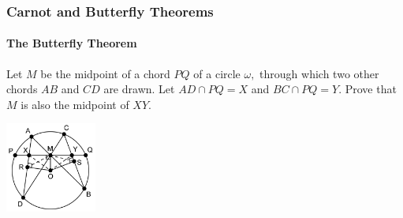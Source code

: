 \documentclass[8pt,xcolor=table,dvipsnames]{beamer}
\begin{document}
\begin{frame}[t]
    \frametitle{Carnot and Butterfly Theorems}
    \framesubtitle{The Butterfly Theorem}
    \begin{theorem}
        \label{problem:24-25-S2-G3-P1}
        Let $M$ be the midpoint of a chord $PQ$ of a circle $\omega,$ through which two other chords $AB$ and $CD$ are drawn.
        Let $AD \cap PQ = X$ and $BC \cap PQ = Y.$ Prove that $M$ is also the midpoint of $XY.$
    \end{theorem}
    
    \begin{center}
        \includegraphics[width=3cm]{./png/24-25-s2-g3-p1.png}
    \end{center}

\end{frame}
\end{document}
